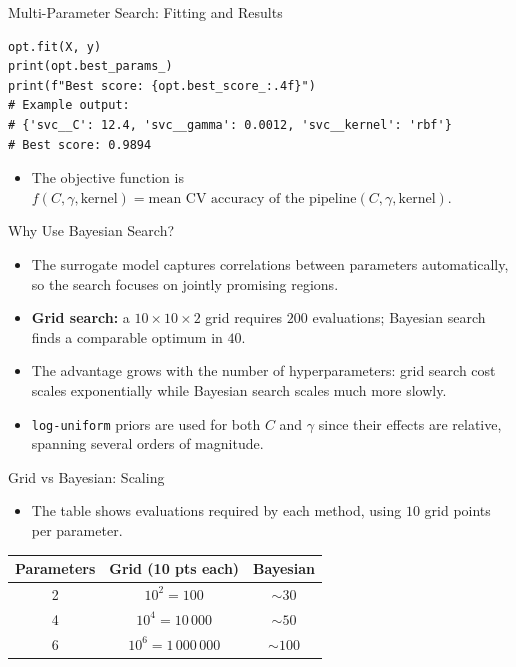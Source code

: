 \documentclass{beamer}
\begin{document}
\begin{frame}[fragile]{Multi-Parameter Search: Fitting and Results}
  \begin{lstlisting}
opt.fit(X, y)
print(opt.best_params_)
print(f"Best score: {opt.best_score_:.4f}")
# Example output:
# {'svc__C': 12.4, 'svc__gamma': 0.0012, 'svc__kernel': 'rbf'}
# Best score: 0.9894
  \end{lstlisting}
  \begin{itemize}
    \item The objective function is \(f(C, \gamma, \text{kernel}) = \text{mean CV accuracy of the pipeline}(C, \gamma, \text{kernel}).\)
  \end{itemize}
\end{frame}

\begin{frame}{Why Use Bayesian Search?}
  \begin{itemize}
    \item The surrogate model captures correlations between parameters automatically, so the search focuses on jointly promising regions.
    \item \textbf{Grid search:} a \(10 \times 10 \times 2\) grid requires \(200\) evaluations; Bayesian search finds a comparable optimum in \(40.\)
    \item The advantage grows with the number of hyperparameters: grid search cost scales exponentially while Bayesian search scales much more slowly.
    \item \texttt{log-uniform} priors are used for both \(C\) and \(\gamma\) since their effects are relative, spanning several orders of magnitude.
  \end{itemize}
\end{frame}

\begin{frame}{Grid vs Bayesian: Scaling}
  \begin{itemize}
    \item The table shows evaluations required by each method, using \(10\) grid points per parameter.
  \end{itemize}
  \begin{center}
  \begin{tabular}{ccc}
    \hline
    \textbf{Parameters} & \textbf{Grid (10 pts each)} & \textbf{Bayesian} \\
    \hline
    2 & \(10^2 = 100\) & \(\sim 30\) \\
    4 & \(10^4 = 10\,000\) & \(\sim 50\) \\
    6 & \(10^6 = 1\,000\,000\) & \(\sim 100\) \\
    \hline
  \end{tabular}
  \end{center}
\end{frame}
\end{document}
